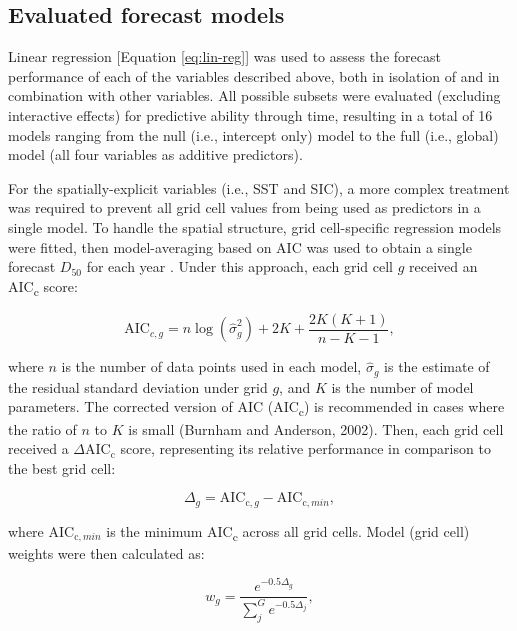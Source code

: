\documentclass[12pt,]{book}
\theoremstyle{definition}
\theoremstyle{definition}
\theoremstyle{definition}
\theoremstyle{remark}
\begin{document}
\subsection{Evaluated forecast models}\label{rtf-models}

\noindent
Linear regression {[}Equation \eqref{eq:lin-reg}{]} was used to assess the
forecast performance of each of the variables described above, both in
isolation of and in combination with other variables. All possible
subsets were evaluated (excluding interactive effects) for predictive
ability through time, resulting in a total of 16 models ranging from the
null (i.e., intercept only) model to the full (i.e., global) model (all
four variables as additive predictors).

For the spatially-explicit variables (i.e., SST and SIC), a more complex
treatment was required to prevent all grid cell values from being used
as predictors in a single model. To handle the spatial structure, grid
cell-specific regression models were fitted, then model-averaging based
on AIC was used to obtain a single forecast \(D_{50}\) for each year
\citep{burnham-anderson-2002}. Under this approach, each grid cell \(g\)
received an AIC\textsubscript{c} score:

\begin{equation}
  \text{AIC}_{c,g}=n \log{\left(\hat{\sigma}_g^2\right) + 2K + \frac{2K(K+1)}{n-K-1}},
  \label{eq:aicc}
\end{equation}

\noindent
where \(n\) is the number of data points used in each model,
\(\hat{\sigma}_g\) is the estimate of the residual standard deviation
under grid \(g\), and \(K\) is the number of model parameters. The
corrected version of AIC (AIC\textsubscript{c}) is recommended in cases
where the ratio of \(n\) to \(K\) is small (Burnham and Anderson, 2002).
Then, each grid cell received a \(\Delta\text{AIC}_\text{c}\) score,
representing its relative performance in comparison to the best grid
cell:

\begin{equation}
  \Delta_g=\text{AIC}_{\text{c},g}-\text{AIC}_{\text{c},min},
  \label{eq:delta-aicc}
\end{equation}

\noindent
where \(\text{AIC}_{\text{c},min}\) is the minimum AIC\textsubscript{c}
across all grid cells. Model (grid cell) weights were then calculated
as:

\begin{equation}
  w_g=\frac{e^{-0.5\Delta_g}}{\sum_j^G e^{-0.5\Delta_j}},
\label{eq:aicc-weights}
\end{equation}
\end{document}
